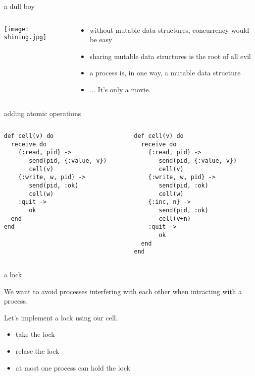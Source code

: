 \begin{frame}{a dull boy}

\begin{columns}
 \begin{column}{0.5\linewidth}
   \texttt{[image: shining.jpg]}
 \end{column}
 \pause
 \begin{column}{0.5\linewidth}
   \begin {itemize}
    \item without mutable data structures, concurrency would be easy
    \item sharing mutable data structures is the root of all evil
    \item a process is, in one way, a mutable data structure
    \pause
    \item ... It's only a movie.
   \end{itemize}
 \end{column}
 \end{columns}

\end{frame}

\begin{frame}[fragile]{adding atomic operations}

\begin{columns}
 \begin{column}{0.5\linewidth}
\begin{verbatim}
def cell(v) do
  receive do
    {:read, pid} ->
       send(pid, {:value, v})
       cell(v)
    {:write, w, pid} ->
       send(pid, :ok)
       cell(w)
    :quit ->
       ok
  end
end
\end{verbatim}
 \end{column}
\pause
 \begin{column}{0.5\linewidth}
\begin{verbatim}
def cell(v) do
  receive do
    {:read, pid} ->
       send(pid, {:value, v})
       cell(v)
    {:write, w, pid} ->
       send(pid, :ok)
       cell(w)
    {:inc, n} ->
       send(pid, :ok)
       cell(v+n)       
    :quit ->
       ok
  end
end
\end{verbatim}
 \end{column}
\end{columns}

\end{frame}

\begin{frame}[fragile]{a lock}

\vspace{10pt}

We want to avoid processes interfering with each other when intracting
with a process.

\vspace{10pt}
Let's implement a lock using our cell.

\pause
\begin{itemize}
 \item take the lock
 \item relase the lock
 \item at most one process can hold the lock
\end{itemize}

\end{frame}


